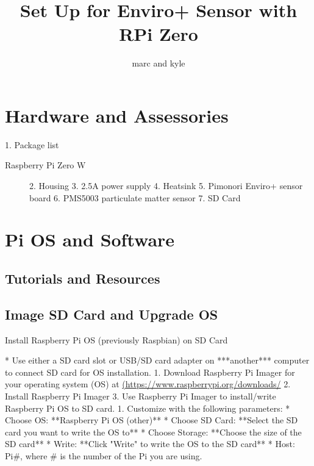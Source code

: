 \documentclass{article}
\author{marc and kyle}
\title{Set Up for Enviro+ Sensor with RPi Zero}
\begin{document}
\maketitle

\section{Hardware and Assessories}

1. Package list
\begin{description}
  \item[Raspberry Pi Zero W]
    2. Housing
    3. 2.5A power supply
    4. Heatsink
    5. Pimonori Enviro+ sensor board
    6. PMS5003 particulate matter sensor
    7. SD Card
\end{description}

    
    
    

\section{Pi OS and Software}

\subsection{Tutorials and Resources}





\subsection{Image SD Card and Upgrade OS}

Install Raspberry Pi OS (previously Raspbian) on SD Card


* Use either a SD card slot or USB/SD card adapter on ***another*** computer to connect SD card for OS installation.
    1. Download Raspberry Pi Imager for your operating system (OS) at \href{https://www.raspberrypi.org/downloads/}{(https://www.raspberrypi.org/downloads/}
    2. Install Raspberry Pi Imager
    3. Use Raspberry Pi Imager to install/write Raspberry Pi OS to SD card.
        1. Customize with the following parameters: 
            * Choose OS: **Raspberry Pi OS (other)**
            * Choose SD Card: **Select the SD card you want to write the OS to**
            * Choose Storage: **Choose the size of the SD card**
            * Write: **Click "Write" to write the OS to the SD card**
            * Host: Pi\#, where \# is the number of the Pi you are using.
\end{document}
